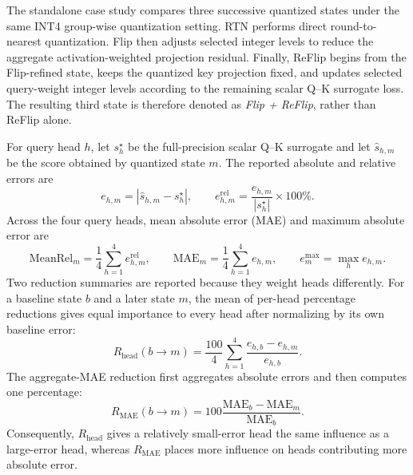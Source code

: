 \documentclass[../main.tex]{subfiles}
\begin{document}
The standalone case study compares three successive quantized states under the same INT4 group-wise quantization setting. RTN performs direct round-to-nearest quantization. Flip then adjusts selected integer levels to reduce the aggregate activation-weighted projection residual. Finally, ReFlip begins from the Flip-refined state, keeps the quantized key projection fixed, and updates selected query-weight integer levels according to the remaining scalar Q--K surrogate loss. The resulting third state is therefore denoted as \textit{Flip + ReFlip}, rather than ReFlip alone.

For query head $h$, let $s_h^\star$ be the full-precision scalar Q--K surrogate and let $\widehat{s}_{h,m}$ be the score obtained by quantized state $m$. The reported absolute and relative errors are
\[
e_{h,m}=\left|\widehat{s}_{h,m}-s_h^\star\right|,
\qquad
e^{\mathrm{rel}}_{h,m}
=
\frac{e_{h,m}}{|s_h^\star|}\times 100\%.
\]
Across the four query heads, mean absolute error (MAE) and maximum absolute error are
\[
\mathrm{MeanRel}_m=\frac{1}{4}\sum_{h=1}^{4}e^{\mathrm{rel}}_{h,m},
\qquad
\mathrm{MAE}_m=\frac{1}{4}\sum_{h=1}^{4}e_{h,m},
\qquad
e^{\max}_m=\max_h e_{h,m}.
\]
Two reduction summaries are reported because they weight heads differently. For a baseline state $b$ and a later state $m$, the mean of per-head percentage reductions gives equal importance to every head after normalizing by its own baseline error:
\[
R_{\mathrm{head}}(b\!\rightarrow\!m)
=
\frac{100}{4}
\sum_{h=1}^{4}
\frac{e_{h,b}-e_{h,m}}{e_{h,b}}.
\]
The aggregate-MAE reduction first aggregates absolute errors and then computes one percentage:
\[
R_{\mathrm{MAE}}(b\!\rightarrow\!m)
=
100
\frac{\mathrm{MAE}_{b}-\mathrm{MAE}_{m}}
{\mathrm{MAE}_{b}}.
\]
Consequently, $R_{\mathrm{head}}$ gives a relatively small-error head the same influence as a large-error head, whereas $R_{\mathrm{MAE}}$ places more influence on heads contributing more absolute error.

\begin{table}[H]
\centering
\caption[Standalone scalar Q--K surrogate error]{Standalone scalar Q--K surrogate error on Llama-3-8B layer 8, GQA group 3.}
\label{tab:qkv-standalone-summary}
\setlength{\tabcolsep}{6pt}
\renewcommand{\arraystretch}{1.15}
\end{table}
\end{document}
